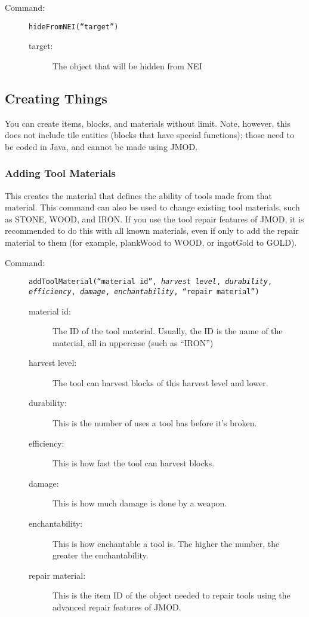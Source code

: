\documentclass[letterpaper,titlepage,12pt]{article}
\begin{document}
\begin{description}
\item[Command:] \texttt{hideFromNEI(``\emph{target}'')}

\begin{description}
\item [target:] The object that will be hidden from NEI
\end{description}
\end{description}


\subsection{Creating Things}

You can create items, blocks, and materials without limit.  Note, however, this does not include tile entities (blocks that have special functions); those need to be coded in Java, and cannot be made using JMOD.

\subsubsection{Adding Tool Materials}

This creates the material that defines the ability of tools made from that material.  This command can also be used to change existing tool materials, such as STONE, WOOD, and IRON.  If you use the tool repair features of JMOD, it is recommended to do this with all known materials, even if only to add the repair material to them (for example, plankWood to WOOD, or ingotGold to GOLD).

\begin{description}
\item[Command:] \texttt{addToolMaterial(``\emph{material id}'', \emph{harvest level}, \emph{durability}, \emph{efficiency}, \emph{damage}, \emph{enchantability}, ``\emph{repair material}'')}

\begin{description}
\item [material id:] The ID of the tool material.  Usually, the ID is the name of the material, all in uppercase (such as ``IRON'')
\item [harvest level:] The tool can harvest blocks of this harvest level and lower.
\item [durability:] This is the number of uses a tool has before it's broken.
\item [efficiency:] This is how fast the tool can harvest blocks.
\item [damage:] This is how much damage is done by a weapon.
\item [enchantability:] This is how enchantable a tool is.  The higher the number, the greater the enchantability.
\item [repair material:] This is the item ID of the object needed to repair tools using the advanced repair features of JMOD.
\end{description}
\end{description}
\end{document}
